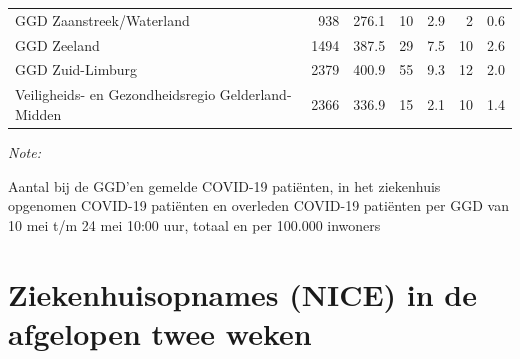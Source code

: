 \documentclass[
  english,
  man,floatsintext]{apa6}
\begin{document}
\begin{table}
\begin{threeparttable}
\begin{tabular}{lrrrrrr}
GGD Zaanstreek/Waterland & 938 & 276.1 & 10 & 2.9 & 2 & 0.6\\
GGD Zeeland & 1494 & 387.5 & 29 & 7.5 & 10 & 2.6\\
GGD Zuid-Limburg & 2379 & 400.9 & 55 & 9.3 & 12 & 2.0\\
Veiligheids- en Gezondheidsregio Gelderland-Midden & 2366 & 336.9 & 15 & 2.1 & 10 & 1.4\\
\bottomrule
\end{tabular}
\begin{tablenotes}
\item \textit{Note: } 
\item Aantal bij de GGD’en gemelde COVID-19 patiënten, in het ziekenhuis opgenomen COVID-19 patiënten en overleden COVID-19 patiënten per GGD van 10 mei t/m 24 mei 10:00 uur, totaal en per 100.000 inwoners
\end{tablenotes}
\end{threeparttable}
\endgroup{}
\end{table}

\newpage

\hypertarget{ziekenhuisopnames-nice-in-de-afgelopen-twee-weken}{%
\section{Ziekenhuisopnames (NICE) in de afgelopen twee weken}\label{ziekenhuisopnames-nice-in-de-afgelopen-twee-weken}}
\end{document}
